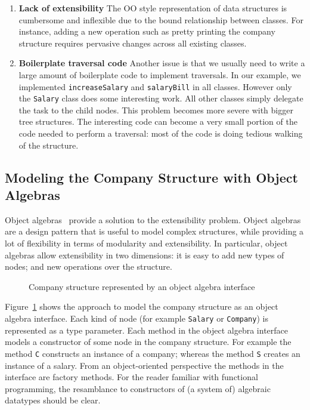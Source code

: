 \begin{enumerate}

\item {\bf Lack of extensibility} The OO style
  representation of data structures is cumbersome and
  inflexible due to the bound relationship between classes. For
  instance, adding a new operation such as pretty
  printing the company structure requires pervasive changes across all
  existing classes.

\item {\bf Boilerplate traversal code} Another issue is that we
  usually need to write a large amount of boilerplate code to
  implement traversals. In our example, we implemented
  \lstinline{increaseSalary} and \lstinline{salaryBill} in all
  classes. However only the \lstinline{Salary} class does some
  interesting work. All other classes simply delegate the task to the
  child nodes. This problem becomes more severe with bigger tree
  structures. The interesting code can become a very small portion of
  the code needed to perform a traversal: most of the code is doing
  tedious walking of the structure.

\end{enumerate}

\subsection{Modeling the Company Structure with Object Algebras}

Object algebras~\cite{bruno12oa} provide a solution to the extensibility problem.
Object algebras are a design pattern that is useful to model complex
structures, while providing a lot of flexibility in terms of
modularity and extensibility. In particular, object algebras allow
extensibility in two dimensions: it is easy to add new types of
nodes; and new operations over the structure.

\begin{figure}[tb]
\vspace{-.1in}
\caption{Company structure represented by an object algebra interface}
\label{syb_tree}
\end{figure}

Figure~\ref{syb_tree} shows the approach to model the company
structure as an object algebra interface. Each kind of node (for
example \lstinline{Salary} or \lstinline{Company}) is represented as a
type parameter. Each method in the object algebra interface models a
constructor of some node in the company structure. For example the
method \lstinline{C} constructs an instance of a company; whereas the
method \lstinline{S} creates an instance of a salary. From an
object-oriented perspective the methods in the interface are factory
methods. For the reader familiar with functional programming, the
resamblance to constructors of  (a system of) algebraic datatypes should be clear.

